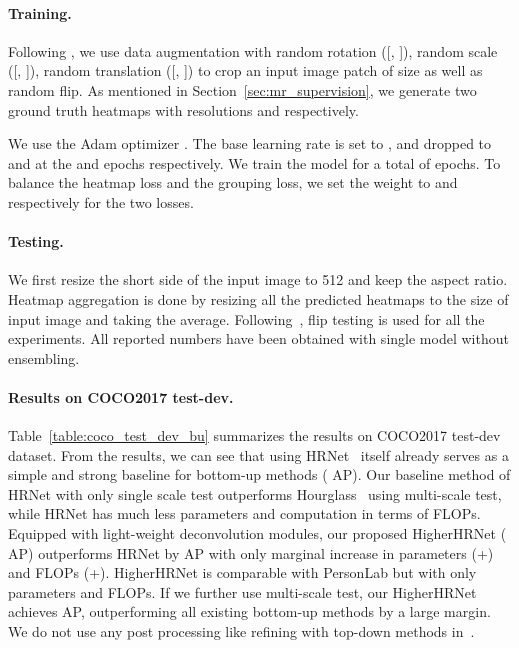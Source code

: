 \documentclass[10pt,twocolumn,letterpaper]{article}
\begin{document}
\paragraph{Training.} Following \cite{newwell2017associative}, we use data augmentation with random rotation ([, ]), random scale ([, ]), random translation ([, ]) to crop an input image patch of size  as well as random flip. As mentioned in Section~\ref{sec:mr_supervision}, we generate two ground truth heatmaps with resolutions  and  respectively.

We use the Adam optimizer \cite{kingma2014adam}. The base learning rate is set to , and dropped to  and  at the  and  epochs respectively. We train the model for a total of  epochs. To balance the heatmap loss and the grouping loss, we set the weight to  and  respectively for the two losses.
\paragraph{Testing.} We first resize the short side of the input image to 512 and keep the aspect ratio. Heatmap aggregation is done by resizing all the predicted heatmaps to the size of input image and taking the average. Following~\cite{newwell2017associative}, flip testing is used for all the experiments. All reported numbers have been obtained with single model without ensembling.
\vspace{-2mm}
\paragraph{Results on COCO2017 test-dev.} Table~\ref{table:coco_test_dev_bu} summarizes the results on COCO2017 test-dev dataset. From the results, we can see that using HRNet~\cite{sun2019deep,WangSCJDZLMTWLX19} itself already serves as a simple and strong baseline for bottom-up methods ( AP). Our baseline method of HRNet with only single scale test outperforms Hourglass~\cite{newwell2017associative} using multi-scale test, while HRNet has much less parameters and computation in terms of FLOPs. Equipped with light-weight deconvolution modules, our proposed HigherHRNet ( AP) outperforms HRNet by  AP with only marginal increase in parameters (+) and FLOPs (+). HigherHRNet is comparable with PersonLab \cite{papandreou2018personlab} but with only  parameters and  FLOPs. If we further use multi-scale test, our HigherHRNet achieves  AP, outperforming all existing bottom-up methods by a large margin. We do not use any post processing like refining with top-down methods in~\cite{cao2017realtime,newwell2017associative}.
\end{document}
